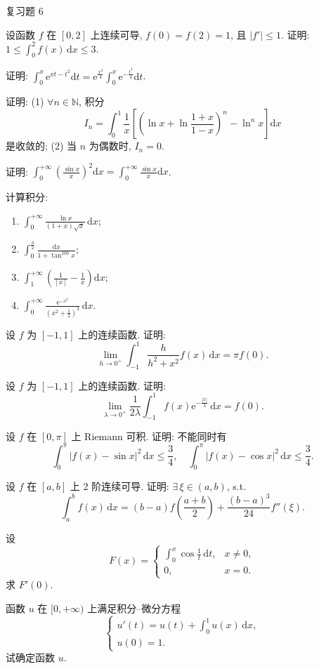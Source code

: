 \begin{exblock}{复习题 6}
\item 设函数 $f$ 在 $[0,2]$ 上连续可导, $f(0)=f(2)=1$, 且 $|f'|\leqslant 1$. 证明: $1\leqslant\int_{0}^{2}f(x)\,\mathrm{d}x\leqslant 3$.

\item 证明: $\int_{0}^{x}\mathrm{e}^{xt-t^{2}}\mathrm{d}t=\mathrm{e}^{\frac{x^{2}}{4}}\int_{0}^{x}\mathrm{e}^{-\frac{t^{2}}{4}}\mathrm{d}t$.

\item 证明: (1) $\forall n\in\mathbb{N}$, 积分
\[
I_{n}=\int_{0}^{1}\frac{1}{x}\left[\left(\ln x+\ln\frac{1+x}{1-x}\right)^{n}-\ln^{n}x\right]\mathrm{d}x
\]
是收敛的;
(2) 当 $n$ 为偶数时, $I_{n}=0$.

\item 证明: $\int_{0}^{+\infty}\left(\frac{\sin x}{x}\right)^{2}\mathrm{d}x=\int_{0}^{+\infty}\frac{\sin x}{x}\mathrm{d}x$.

\item 计算积分:
\begin{enumerate}[label=(\arabic*)]
  \item $\int_{0}^{+\infty}\frac{\ln x}{(1+x)\sqrt{x}}\,\mathrm{d}x$;
  \item $\int_{0}^{\frac{\pi}{2}}\frac{\mathrm{d}x}{1+\tan^{100}x}$;
  \item $\int_{1}^{+\infty}\left(\frac{1}{[x]}-\frac{1}{x}\right)\mathrm{d}x$;
  \item $\int_{0}^{+\infty}\frac{\mathrm{e}^{-x^{2}}}{\left(x^{2}+\frac{1}{2}\right)^{2}}\,\mathrm{d}x$.
\end{enumerate}

\item 设 $f$ 为 $[-1,1]$ 上的连续函数. 证明:
\[
\lim_{h\to 0^{+}}\int_{-1}^{1}\frac{h}{h^{2}+x^{2}}f(x)\,\mathrm{d}x=\pi f(0).
\]

\item 设 $f$ 为 $[-1,1]$ 上的连续函数. 证明:
\[
\lim_{\lambda\to 0^{+}}\frac{1}{2\lambda}\int_{-1}^{1}f(x)\mathrm{e}^{-\frac{|x|}{\lambda}}\,\mathrm{d}x=f(0).
\]

\item 设 $f$ 在 $[0,\pi]$ 上 Riemann 可积. 证明: 不能同时有
\[
\int_{0}^{\pi}|f(x)-\sin x|^{2}\,\mathrm{d}x\leqslant\frac{3}{4},\quad\int_{0}^{\pi}|f(x)-\cos x|^{2}\,\mathrm{d}x\leqslant\frac{3}{4}.
\]

\item 设 $f$ 在 $[a,b]$ 上 2 阶连续可导. 证明: $\exists\,\xi\in(a,b)$, s.t.
\[
\int_{a}^{b}f(x)\,\mathrm{d}x=(b-a)f\left(\frac{a+b}{2}\right)+\frac{(b-a)^{3}}{24}f''(\xi).
\]

\item 设
\[
F(x)=\begin{cases}\displaystyle\int_{0}^{x}\cos\frac{1}{t}\,\mathrm{d}t, & x\neq 0,\\[2mm] 0, & x=0.\end{cases}
\]
求 $F'(0)$.

\item 函数 $u$ 在 $[0,+\infty)$ 上满足积分--微分方程
\[
\begin{cases}
u'(t)=u(t)+\displaystyle\int_{0}^{1}u(x)\,\mathrm{d}x,\\
u(0)=1.
\end{cases}
\]
试确定函数 $u$.
\end{exblock}
